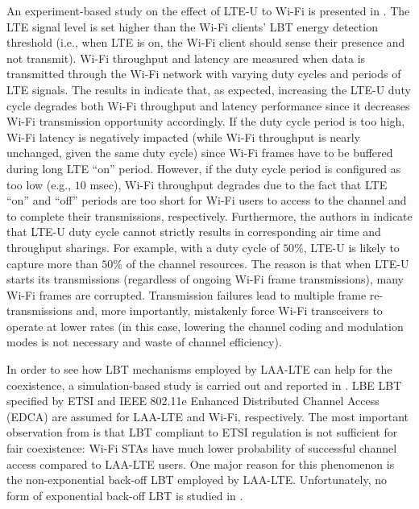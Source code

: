 \documentclass[journal,draftclsnofoot,12pt,onecolumn]{IEEEtran}
\begin{document}
An experiment-based study on the effect of LTE-U to Wi-Fi is presented in \cite{LTE-U-CableLabs}. The LTE signal level is set higher than the Wi-Fi clients' LBT energy detection threshold (i.e., when LTE is on, the Wi-Fi client should sense their presence and not transmit). Wi-Fi throughput and latency are measured when data is transmitted through the Wi-Fi network with varying duty cycles and periods of LTE signals. The results in \cite{LTE-U-CableLabs} indicate that, as expected, increasing the LTE-U duty cycle degrades both Wi-Fi throughput and latency performance since it decreases Wi-Fi transmission opportunity accordingly. If the duty cycle period is too high, Wi-Fi latency is negatively impacted (while Wi-Fi throughput is nearly unchanged, given the same duty cycle) since Wi-Fi frames have to be buffered during long LTE ``on'' period. However, if the duty cycle period is configured as too low (e.g., $10$ msec), Wi-Fi throughput degrades due to the fact that LTE ``on'' and ``off'' periods are too short for Wi-Fi users to access to the channel and to complete their transmissions, respectively. Furthermore, the authors in \cite{LTE-U-CableLabs} indicate that LTE-U duty cycle cannot strictly results in corresponding air time and throughput sharings. For example, with a duty cycle of $50$\%, LTE-U is likely to capture more than $50$\% of the channel resources. The reason is that when LTE-U starts its transmissions (regardless of ongoing Wi-Fi frame transmissions), many Wi-Fi frames are corrupted. Transmission failures lead to multiple frame re-transmissions and, more importantly, mistakenly force Wi-Fi transceivers to operate at lower rates (in this case, lowering the channel coding and modulation modes is not necessary and waste of channel efficiency).

In order to see how LBT mechanisms employed by LAA-LTE can help for the coexistence, a simulation-based study is carried out and reported in \cite{LBT-CableLabs-2014}. LBE LBT specified by ETSI \cite{LBT-ETSI-2014} and IEEE 802.11e Enhanced Distributed Channel Access (EDCA) are assumed for LAA-LTE and Wi-Fi, respectively. The most important observation from \cite{LBT-CableLabs-2014} is that LBT compliant to ETSI regulation is not sufficient for fair coexistence: Wi-Fi STAs have much lower probability of successful channel access compared to LAA-LTE users. One major reason for this phenomenon is the non-exponential back-off LBT employed by LAA-LTE. Unfortunately, no form of exponential back-off LBT is studied in \cite{LBT-CableLabs-2014}.
\end{document}
